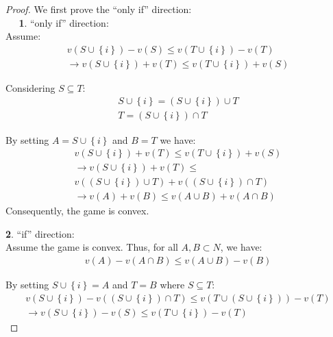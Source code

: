 \begin{proof}
We first prove the ``only if'' direction:
\\$~~~~$\ \textbf{1}. ``only if'' direction:\\
Assume:\\
\vspace{-0.5cm}
\begin{gather*}\label{convexsnowproof}
v(S \cup \left\{i\right\}) - v(S) \leq v (T \cup \left\{i\right\})
- v(T)
\\
\rightarrow v(S \cup \left\{i\right\}) + v(T) \leq v (T \cup \left\{i\right\}) + v(S)
\end{gather*}

Considering $S \subseteq T$:
\setlength{\abovedisplayshortskip}{2pt}
\begin{gather*}
S \cup \left\{i\right\} = (S \cup \left\{i\right\}) \cup T
\\
T = (S \cup \left\{i\right\}) \cap T
\end{gather*}

By setting $A = S \cup \left\{i\right\}$ and $B = T$ we have:
\setlength{\abovedisplayshortskip}{2pt}
\begin{gather*}
v(S \cup \left\{i\right\}) + v(T) \leq v (T \cup \left\{i\right\}) + v(S)
\\
\rightarrow v(S \cup \left\{i\right\}) + v(T) \leq
\\
v((S \cup \left\{i\right\}) \cup T) + v((S \cup \left\{i\right\}) \cap T)
\\
\rightarrow v(A) + v(B) \leq v(A \cup B) + v(A \cap B)
\end{gather*}
Consequently, the game is convex.

\textbf{2}. ``if'' direction:\\
Assume the game is convex. Thus, for all $A, B \subset N$, we
have: \setlength{\abovedisplayshortskip}{2pt}
\begin{gather*}
v(A) - v(A \cap B) \leq v(A \cup B) - v(B)
\end{gather*}

By setting $S \cup \left\{i\right\} = A$ and $T = B$ where $S \subseteq T$:
\setlength{\abovedisplayshortskip}{2pt}
\begin{gather*}
v(S \cup \left\{i\right\}) - v((S \cup \left\{i\right\}) \cap T) \leq v(T \cup (S \cup \left\{i\right\})) - v(T)
\\
\rightarrow v(S \cup \left\{i\right\}) - v(S) \leq v(T \cup \left\{i\right\}) - v(T)
\end{gather*}

\end{proof}


